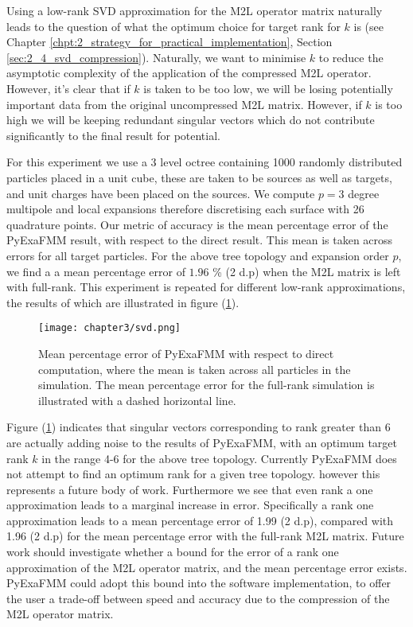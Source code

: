Using a low-rank \gls{SVD} approximation for the \gls{M2L} operator matrix
naturally leads to the question of what the optimum choice for target rank for $k$
is (see Chapter \ref{chpt:2_strategy_for_practical_implementation}, Section \ref{sec:2_4_svd_compression}).
Naturally, we want to minimise $k$ to reduce the asymptotic complexity of
the application of the compressed \gls{M2L} operator. However, it's clear that
if $k$ is taken to be too low, we will be losing potentially important data
from the original uncompressed \gls{M2L} matrix. However, if $k$ is too high
we will be keeping redundant singular vectors which do not contribute significantly
to the final result for potential.

For this experiment we use a 3 level octree containing 1000 randomly distributed
particles placed in a unit cube, these are taken to be sources as well as targets, and
unit charges have been placed on the sources. We compute $p=3$ degree multipole and
local expansions therefore discretising each surface with 26 quadrature points.
Our metric of accuracy is the mean percentage error of the \gls{PyExaFMM} result,
with respect to the direct result. This mean is taken across errors for all target particles. For the above
tree topology and expansion order $p$, we find a a mean percentage error of
$1.96$ \% (2 d.p) when the \gls{M2L} matrix is left with full-rank.
This experiment is repeated for different low-rank approximations,
the results of which are illustrated in figure (\ref{fig:3_2_svd}).

\begin{figure}[ht]
    \centering

  {\texttt{[image: chapter3/svd.png]}}
  \vspace{0pt}
    \caption{Mean percentage error of \gls{PyExaFMM} with respect to direct
    computation, where the mean is taken across all particles in the simulation.
    The mean percentage error for the full-rank simulation is illustrated with
    a dashed horizontal line.
    }
    \label{fig:3_2_svd}
\end{figure}

Figure (\ref{fig:3_2_svd}) indicates that singular vectors corresponding to rank
greater than 6 are actually adding noise to the results of \gls{PyExaFMM}, with
an optimum target rank $k$ in the range 4-6 for the above tree topology. Currently
\gls{PyExaFMM} does not attempt to find an optimum rank for a given tree topology.
however this represents a future body of work. Furthermore we see that even rank a
one approximation leads to a marginal increase in error. Specifically a rank one
approximation leads to a mean percentage error of 1.99 (2 d.p), compared with
1.96 (2 d.p) for the mean percentage error with the full-rank \gls{M2L} matrix.
Future work should investigate whether a bound for the error of a
rank one approximation of the \gls{M2L} operator matrix, and the mean percentage
error exists. \gls{PyExaFMM} could adopt this bound into the software implementation,
to offer the user a trade-off between speed and accuracy due to the compression of
the \gls{M2L} operator matrix.

